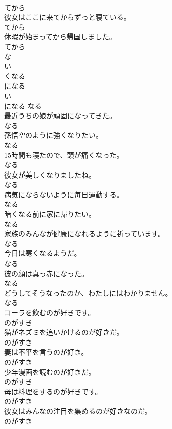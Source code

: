 \documentclass[8pt]{extreport}
\begin{document}
\begin{CJK}{UTF8}{min}
\\	てから	
\\	彼女はここに来てからずっと寝ている。	
\\	てから	
\\	休暇が始まってから帰国しました。	
\\	てから	
\\	な
\\	い 
\\	くなる	
\\	になる	
\\	い
\\	になる	なる	
\\	最近うちの娘が頑固になってきた。	
\\	なる	
\\	孫悟空のように強くなりたい。	
\\	なる	
\\	15時間も寝たので、頭が痛くなった。	
\\	なる	
\\	彼女が美しくなりましたね。	
\\	なる	
\\	病気にならないように毎日運動する。	
\\	なる	
\\	暗くなる前に家に帰りたい。	
\\	なる	
\\	家族のみんなが健康になれるように祈っています。	
\\	なる	
\\	今日は寒くなるようだ。	
\\	なる	
\\	彼の顔は真っ赤になった。	
\\	なる	
\\	どうしてそうなったのか、わたしにはわかりません。	
\\	なる	
\\	コーラを飲むのが好きです。	
\\	のがすき	
\\	猫がネズミを追いかけるのが好きだ。	
\\	のがすき	
\\	妻は不平を言うのが好き。	
\\	のがすき	
\\	少年漫画を読むのが好きだ。	
\\	のがすき	
\\	母は料理をするのが好きです。	
\\	のがすき	
\\	彼女はみんなの注目を集めるのが好きなのだ。	
\\	のがすき	

\end{CJK}
\end{document}
